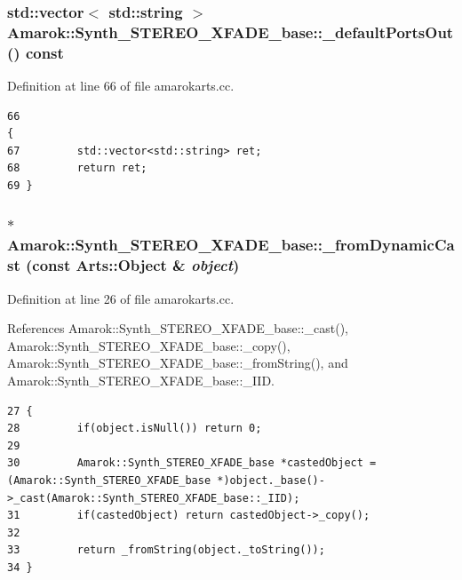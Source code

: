 \subsubsection{\setlength{\rightskip}{0pt plus 5cm}std::vector$<$ std::string $>$ Amarok::Synth\_\-STEREO\_\-XFADE\_\-base::\_\-default\-Ports\-Out () const\hspace{0.3cm}{\tt  [virtual, inherited]}}\label{classAmarok_1_1Synth__STEREO__XFADE__base_Amarok_1_1Synth__STEREO__XFADE__stuba5}




Definition at line 66 of file amarokarts.cc.



\footnotesize\begin{verbatim}66                                                                            {
67         std::vector<std::string> ret;
68         return ret;
69 }
\end{verbatim}\normalsize 
{}
\subsubsection{ $\ast$ Amarok::Synth\_\-STEREO\_\-XFADE\_\-base::\_\-from\-Dynamic\-Cast (const Arts::Object \& {\em object})\hspace{0.3cm}{\tt  [static, inherited]}}\label{classAmarok_1_1Synth__STEREO__XFADE__base_Amarok_1_1Synth__STEREO__XFADE__stube3}




Definition at line 26 of file amarokarts.cc.

References Amarok::Synth\_\-STEREO\_\-XFADE\_\-base::\_\-cast(), Amarok::Synth\_\-STEREO\_\-XFADE\_\-base::\_\-copy(), Amarok::Synth\_\-STEREO\_\-XFADE\_\-base::\_\-from\-String(), and Amarok::Synth\_\-STEREO\_\-XFADE\_\-base::\_\-IID.



\footnotesize\begin{verbatim}27 {
28         if(object.isNull()) return 0;
29 
30         Amarok::Synth_STEREO_XFADE_base *castedObject = (Amarok::Synth_STEREO_XFADE_base *)object._base()->_cast(Amarok::Synth_STEREO_XFADE_base::_IID);
31         if(castedObject) return castedObject->_copy();
32 
33         return _fromString(object._toString());
34 }
\end{verbatim}\normalsize 


